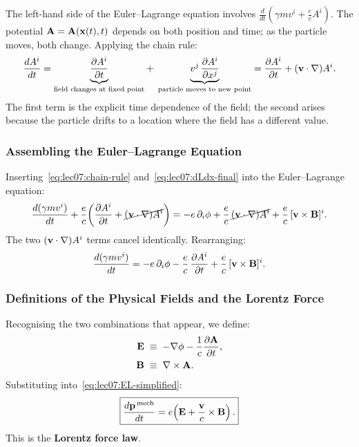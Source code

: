 The left-hand side of the Euler--Lagrange equation involves
$\frac{d}{dt}(\gamma mv^i + \tfrac{e}{c}A^i)$.  The potential
$\mathbf{A} = \mathbf{A}(\mathbf{x}(t),t)$ depends on both position and time; as the
particle moves, both change.  Applying the chain rule:
\begin{equation}\label{eq:lec07:chain-rule}
    \frac{dA^i}{dt}
    = \underbrace{\frac{\partial A^i}{\partial t}}_{\text{field changes at fixed point}}
      +\; \underbrace{v^j\,\frac{\partial A^i}{\partial x^j}}_{\text{particle moves to new point}}
    = \frac{\partial A^i}{\partial t} + (\mathbf{v}\cdot\nabla)A^i .
\end{equation}
The first term is the explicit time dependence of the field; the second arises
because the particle drifts to a location where the field has a different value.

\subsubsection*{Assembling the Euler--Lagrange Equation}

Inserting~\eqref{eq:lec07:chain-rule} and~\eqref{eq:lec07:dLdx-final} into the
Euler--Lagrange equation:
\begin{equation}\label{eq:lec07:EL-assembled}
    \frac{d(\gamma mv^i)}{dt}
    + \frac{e}{c}\!\left(\frac{\partial A^i}{\partial t}
      + \cancel{(\mathbf{v}\cdot\nabla)A^i}\right)
    = -e\,\partial_i\phi + \frac{e}{c}\,\cancel{(\mathbf{v}\cdot\nabla)A^i}
      + \frac{e}{c}\,[\mathbf{v}\times\mathbf{B}]^i .
\end{equation}
The two $(\mathbf{v}\cdot\nabla)A^i$ terms cancel identically.  Rearranging:
\begin{equation}\label{eq:lec07:EL-simplified}
    \frac{d(\gamma mv^i)}{dt}
    = -e\,\partial_i\phi - \frac{e}{c}\,\frac{\partial A^i}{\partial t}
      + \frac{e}{c}\,[\mathbf{v}\times\mathbf{B}]^i .
\end{equation}

\subsubsection*{Definitions of the Physical Fields and the Lorentz Force}

Recognising the two combinations that appear, we define:
\begin{align}
    \mathbf{E} &\;\equiv\; -\nabla\phi - \frac{1}{c}\frac{\partial\mathbf{A}}{\partial t} ,
    \label{eq:lec07:E-def}\\
    \mathbf{B} &\;\equiv\; \nabla\times\mathbf{A} .
    \label{eq:lec07:B-def}
\end{align}
Substituting into~\eqref{eq:lec07:EL-simplified}:
\begin{equation}\label{eq:lec07:lorentz-force}
    \boxed{\frac{d\mathbf{p}^{\,\text{mech}}}{dt}
    = e\!\left(\mathbf{E} + \frac{\mathbf{v}}{c}\times\mathbf{B}\right).}
\end{equation}
This is the \textbf{Lorentz force law}.

